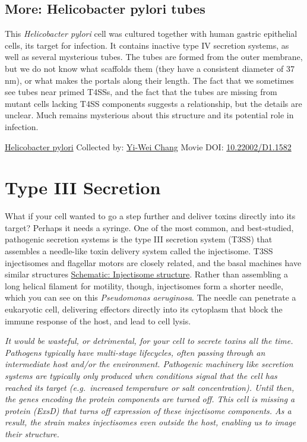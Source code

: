 \documentclass[]{tufte-book}
\begin{document}
\hypertarget{Helicobacter_pylori_tubes}{%
\subsection*{More: Helicobacter pylori tubes}\label{Helicobacter_pylori_tubes}}

This \emph{Helicobacter pylori} cell was cultured together with human gastric epithelial cells, its target for infection. It contains inactive type IV secretion systems, as well as several mysterious tubes. The tubes are formed from the outer membrane, but we do not know what scaffolds them (they have a consistent diameter of 37 nm), or what makes the portals along their length. The fact that we sometimes see tubes near primed T4SSs, and the fact that the tubes are missing from mutant cells lacking T4SS components suggests a relationship, but the details are unclear. Much remains mysterious about this structure and its potential role in infection.



\hypertarget{htmlwidget-d5a3a1f4df4cd8419492}{}

\label{fig:9-3a}\protect\hyperlink{tree}{Helicobacter pylori} Collected by: \protect\hyperlink{yi-wei_chang}{Yi-Wei Chang} Movie DOI: \href{https://doi.org/10.22002/D1.1582}{10.22002/D1.1582}

\hypertarget{type-iii-secretion}{%
\section{Type III Secretion}\label{type-iii-secretion}}

What if your cell wanted to go a step further and deliver toxins directly into its target? Perhaps it needs a syringe. One of the most common, and best-studied, pathogenic secretion systems is the type III secretion system (T3SS) that assembles a needle-like toxin delivery system called the injectisome. T3SS injectisomes and flagellar motors are closely related, and the basal machines have similar structures \protect\hyperlink{Injectisome_structure}{Schematic: Injectisome structure}. Rather than assembling a long helical filament for motility, though, injectisomes form a shorter needle, which you can see on this \emph{Pseudomonas aeruginosa}. The needle can penetrate a eukaryotic cell, delivering effectors directly into its cytoplasm that block the immune response of the host, and lead to cell lysis.

\emph{It would be wasteful, or detrimental, for your cell to secrete toxins all the time. Pathogens typically have multi-stage lifecycles, often passing through an intermediate host and/or the environment. Pathogenic machinery like secretion systems are typically only produced when conditions signal that the cell has reached its target (e.g.~increased temperature or salt concentration). Until then, the genes encoding the protein components are turned off. This cell is missing a protein (ExsD) that turns off expression of these injectisome components. As a result, the strain makes injectisomes even outside the host, enabling us to image their structure.}
\end{document}
